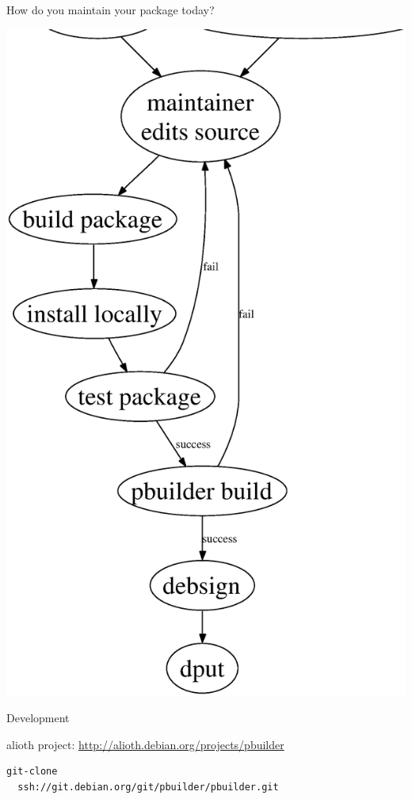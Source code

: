\documentclass[dvipdfm,12pt,times]{beamer}
\begin{document}
\begin{frame}{}
  \begin{minipage}{0.4\hsize}
   How do you maintain your package today?
  \end{minipage}
 \begin{minipage}{0.5\hsize}
  \includegraphics[height=0.95\vsize]{develcycle.eps}
 \end{minipage}
\end{frame}
 
\begin{frame}[containsverbatim]{Development}

alioth project: \url{http://alioth.debian.org/projects/pbuilder}

\begin{verbatim}
git-clone
  ssh://git.debian.org/git/pbuilder/pbuilder.git
\end{verbatim}
\end{frame}
\end{document}
